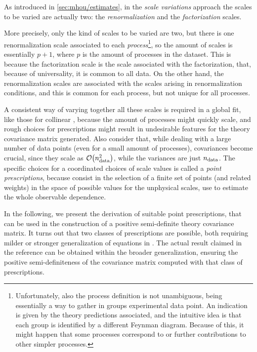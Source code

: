 
As introduced in \cref{sec:mhou/estimates}, in the \textit{scale variations}
approach the scales to be varied are actually two: the \textit{renormalization}
and the \textit{factorization} scales.

More precisely, only the kind of scales to be varied are two, but there is one
renormalization scale associated to each \textit{process}\footnote{
  Unfortunately, also the process definition is not unambiguous, being
  essentially a way to gather in groups experimental data point.
  An indication is given by the theory predictions associated, and the
  intuitive idea is that each group is identified by a different \lo Feynman
  diagram.
  Because of this, it might happen that some processes correspond to \nlo or
  further contributions to other simpler processes.
}, so the amount of scales is essentially $p + 1$, where $p$ is the amount of
processes in the dataset.
This is because the factorization scale is the scale associated with the \pdf
factorization, that, because of universality, it is common to all data.
On the other hand, the renormalization scales are associated with the scales
arising in renormalization conditions, and this is common for each process, but
not unique for all processes.

A consistent way of varying together all these scales is required in a global
\qcd fit, like those for collinear \pdfs, because the amount of processes might
quickly scale, and rough choices for prescriptions might result in undesirable
features for the theory covariance matrix generated.
Also consider that, while dealing with a large number of data points (even for
a small amount of processes), covariances become crucial, since they scale as
$\order{\nd^2}$, while the variances are just $n_{\text{data}}$.
The specific choices for a coordinated choices of scale values is called a
\textit{point prescriptions}, because consist in the selection of a finite set
of points (and related weights) in the space of possible values for the
unphysical scales, use to estimate the whole observable dependence.

In the following, we present the derivation of suitable point prescriptions,
that can be used in the construction of a positive semi-definite theory
covariance matrix.
It turns out that two classes of prescriptions are possible, both requiring
milder or stronger generalization of equations in \cite{NNPDF:2019ubu}.
The actual result claimed in the reference can be obtained within the broader
generalization, ensuring the positive semi-definiteness of the covariance
matrix computed with that class of prescriptions.

